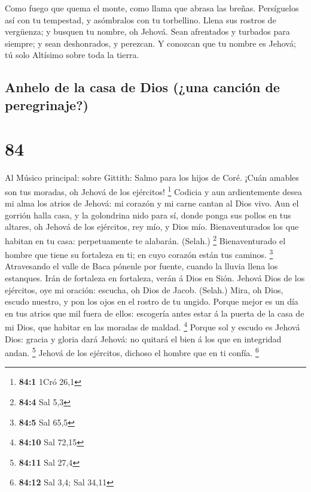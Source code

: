  Como fuego que quema el monte, como llama que abrasa las
breñas.  Persíguelos así con tu tempestad, y asómbralos con
tu torbellino.  Llena sus rostros de vergüenza; y busquen
tu nombre, oh Jehová.  Sean afrentados y turbados para
siempre; y sean deshonrados, y perezcan.  Y conozcan que tu
nombre es Jehová; tú solo Altísimo sobre toda la tierra.

\hypertarget{anhelo-de-la-casa-de-dios-una-canciuxf3n-de-peregrinaje}{%
\subsection{Anhelo de la casa de Dios (¿una canción de
peregrinaje?)}\label{anhelo-de-la-casa-de-dios-una-canciuxf3n-de-peregrinaje}}

\hypertarget{section-83}{%
\section{84}\label{section-83}}

 Al Músico principal: sobre Gittith: Salmo para los hijos de
Coré. ¡Cuán amables son tus moradas, oh Jehová de los ejércitos!
\footnote{\textbf{84:1} 1Cró 26,1}  Codicia y aun
ardientemente desea mi alma los atrios de Jehová: mi corazón y mi carne
cantan al Dios vivo.  Aun el gorrión halla casa, y la
golondrina nido para sí, donde ponga sus pollos en tus altares, oh
Jehová de los ejércitos, rey mío, y Dios mío. 
Bienaventurados los que habitan en tu casa: perpetuamente te alabarán.
(Selah.) \footnote{\textbf{84:4} Sal 5,3}  Bienaventurado el
hombre que tiene su fortaleza en ti; en cuyo corazón están tus caminos.
\footnote{\textbf{84:5} Sal 65,5}  Atravesando el valle de
Baca pónenle por fuente, cuando la lluvia llena los estanques.
 Irán de fortaleza en fortaleza, verán á Dios en Sión.
 Jehová Dios de los ejércitos, oye mi oración: escucha, oh
Dios de Jacob. (Selah.)  Mira, oh Dios, escudo nuestro, y
pon los ojos en el rostro de tu ungido.  Porque mejor es un
día en tus atrios que mil fuera de ellos: escogería antes estar á la
puerta de la casa de mi Dios, que habitar en las moradas de maldad.
\footnote{\textbf{84:10} Sal 72,15}  Porque sol y escudo es
Jehová Dios: gracia y gloria dará Jehová: no quitará el bien á los que
en integridad andan. \footnote{\textbf{84:11} Sal 27,4} 
Jehová de los ejércitos, dichoso el hombre que en ti confía. \footnote{\textbf{84:12}
  Sal 3,4; Sal 34,11}

